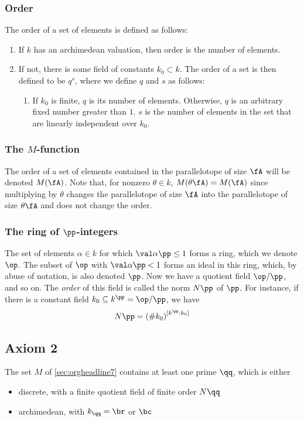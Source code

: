\subsubsection{Order}
\label{sec:orgheadline16}

The order of a set of elements is defined as follows:
\begin{enumerate}
\item If \(k\) has an archimedean valuation, then order is the number of elements.
\label{sec:orgheadline13}
\item If not, there is some field of constants \(k_0\subset k\). The order of a set is then defined to be \(q^s\), where we define \(q\) and \(s\) as follows:
\label{sec:orgheadline15}
\begin{enumerate}
\item If \(k_0\) is finite, \(q\) is its number of elements. Otherwise, \(q\) is an arbitrary fixed number greater than \(1\).
\label{sec:orgheadline14}
\(s\) is the number of elements in the set that are linearly independent over \(k_0\).
\end{enumerate}
\end{enumerate}
\subsubsection{The \(M\)-function}
\label{sec:orgheadline17}
The order of a set of elements contained in the parallelotope of size \(\fA\) will be denoted \(M(\fA)\).
Note that, for nonzero \(\theta\in k\), \(M(\theta\fA)=M(\fA)\) since multiplying by \(\theta\) changes the parallelotope of size \(\fA\) into the parallelotope of size \(\theta\fA\) and does not change the order.
\subsubsection{The ring of \(\pp\)-integers}
\label{sec:orgheadline18}
The set of elements \(\alpha\in k\) for which \(\val\alpha\pp \leq 1\) forms a ring, which we denote \(\op\).
The subset of \(\op\) with \(\val\alpha\pp < 1\) forms an ideal in this ring, which, by abuse of notation, is also denoted \(\pp\). Now we have a quotient field \(\op/\pp\), and so on. The \emph{order} of this field is called the norm \(N\pp\) of \(\pp\). For instance, if there is a constant field \(k_0\subseteq k^{\pp} = \op/\pp\), we have
\[ N\pp = {(\# k_0)}^{[k^\pp : k_0]} \]
\subsection{Axiom 2}
\label{sec:orgheadline20}
The set \(M\) of \ref{sec:orgheadline7} contains at least one prime \(\qq\), which is either
\begin{itemize}
\item discrete, with a finite quotient field of finite order \(N\qq\)
\item archimedean, with \(k_\qq=\br\) or \(\bc\)
\end{itemize}
